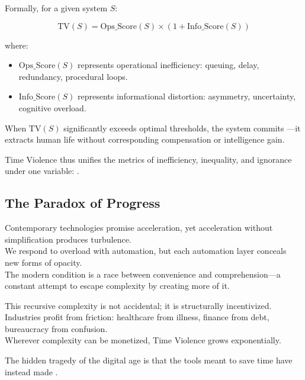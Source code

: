 Formally, for a given system $S$:

\begin{equation}
\label{eq:tv-basic}
\text{TV}(S) = \text{Ops\_Score}(S) \times (1 + \text{Info\_Score}(S))
\end{equation}

where:
\begin{itemize}
    \item $\text{Ops\_Score}(S)$ represents operational inefficiency: queuing, delay, redundancy, procedural loops.
    \item $\text{Info\_Score}(S)$ represents informational distortion: asymmetry, uncertainty, cognitive overload.
\end{itemize}

When $\text{TV}(S)$ significantly exceeds optimal thresholds, the system commits —it extracts human life without corresponding compensation or intelligence gain.

Time Violence thus unifies the metrics of inefficiency, inequality, and ignorance under one variable: .

\subsection{The Paradox of Progress}
\label{sec:paradox}

Contemporary technologies promise acceleration, yet acceleration without simplification produces turbulence.\\
We respond to overload with automation, but each automation layer conceals new forms of opacity.\\
The modern condition is a race between convenience and comprehension—a constant attempt to escape complexity by creating more of it.

This recursive complexity is not accidental; it is structurally incentivized.\\
Industries profit from friction: healthcare from illness, finance from debt, bureaucracy from confusion.\\
Wherever complexity can be monetized, Time Violence grows exponentially.

The hidden tragedy of the digital age is that the tools meant to save time have instead made .

